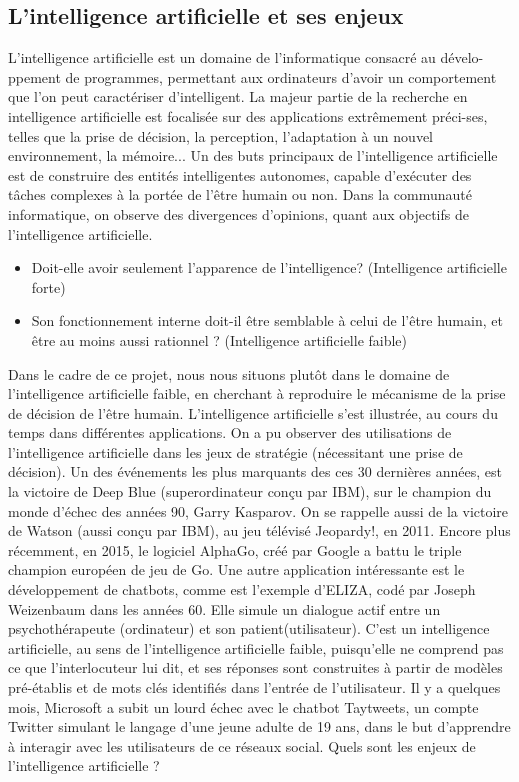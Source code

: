 \documentclass[12pt]{article}
\begin{document}
\subsection{L'intelligence artificielle et ses enjeux}
\justify
L'intelligence artificielle est un domaine de l'informatique consacré au dévelo-ppement de programmes, permettant aux ordinateurs d'avoir un comportement que l'on peut caractériser d'intelligent. La majeur partie de la recherche en intelligence artificielle est focalisée sur des applications extrêmement préci-ses, telles que la prise de décision, la perception, l'adaptation à un nouvel environnement, la mémoire... 
\justify
Un des buts principaux de l'intelligence artificielle est de construire des entités intelligentes autonomes, capable d'exécuter des tâches complexes à la portée de l'être humain ou non. 
\justify
Dans la communauté informatique, on observe des divergences d'opinions, quant aux objectifs de l'intelligence artificielle. 
\begin{itemize}
\item Doit-elle avoir seulement l'apparence de l'intelligence? (Intelligence artificielle forte)
\item Son fonctionnement interne doit-il être semblable à celui de l'être humain, et être au moins aussi rationnel ? (Intelligence artificielle faible)
\end{itemize}
Dans le cadre de ce projet, nous nous situons plutôt dans le domaine de l'intelligence artificielle faible, en cherchant à reproduire le mécanisme de la prise de décision de l'être humain. 
\justify
L'intelligence artificielle s'est illustrée, au cours du temps dans différentes applications. On a pu observer des utilisations de l'intelligence artificielle dans les jeux de stratégie (nécessitant une prise de décision). 
\justify
Un des événements les plus marquants des ces 30 dernières années, est la victoire de Deep Blue (superordinateur conçu par IBM), sur le champion du monde d'échec des années 90, Garry Kasparov. On se rappelle aussi de la victoire de Watson (aussi conçu par IBM), au jeu télévisé Jeopardy!, en 2011. Encore plus récemment, en 2015, le logiciel AlphaGo, créé par Google a battu le triple champion européen de jeu de Go.
\justify
Une autre application intéressante est le développement de chatbots, comme est l'exemple d'ELIZA, codé par Joseph Weizenbaum dans les années 60. Elle simule un dialogue actif entre un psychothérapeute (ordinateur) et son patient(utilisateur). C'est un intelligence artificielle, au sens de l'intelligence artificielle faible, puisqu'elle ne comprend pas ce que l'interlocuteur lui dit, et ses réponses sont construites à partir de modèles pré-établis et de mots clés identifiés dans l'entrée de l'utilisateur.
\justify
Il y a quelques mois, Microsoft a subit un lourd échec avec le chatbot Taytweets, un compte Twitter simulant le langage d'une jeune adulte de 19 ans, dans le but d'apprendre à interagir avec les utilisateurs de ce réseaux social.
\justify 
Quels sont les enjeux de l'intelligence artificielle ? 
\end{document}

